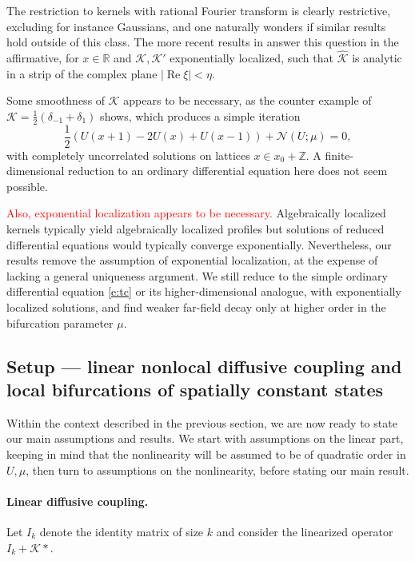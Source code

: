 \documentclass[10pt]{article}
\newcommand{\R}{\mathbb{R}}
\newcommand{\Z}{\mathbb{Z}}
\def\Re{\mathop{\mathrm{Re}}}
\newcommand{\Nl}{\mathcal{N}}
\newcommand{\K}{\mathcal{K}}
\begin{document}
The restriction to kernels with rational Fourier transform is clearly restrictive, excluding for instance Gaussians, and one naturally wonders if similar results hold outside of this class. The more recent results in \cite{FScmfd} answer this question in the affirmative, for $x\in\R$ and $\K,\K'$ exponentially localized, such that $\hat{\K}$ is analytic in a strip of the complex plane $|\Re\xi|<\eta$. 

Some smoothness of $\K$ appears to be necessary, as the counter example of $\K=\frac{1}{2}(\delta_{-1}+\delta_{1})$ shows, which produces a simple iteration 
\[
\frac{1}{2}\left(U(x+1)-2U(x)+U(x-1)\right)+\Nl(U;\mu)=0,
\]
with completely uncorrelated solutions on lattices $x\in x_0+\Z$. A finite-dimensional reduction to an ordinary differential equation here does not seem possible. 

\textcolor{red}{Also, exponential localization appears to be necessary.} Algebraically localized kernels typically yield algebraically localized profiles but solutions of reduced differential equations would typically converge exponentially. Nevertheless, our results remove the assumption of exponential localization, at the expense of lacking a general uniqueness argument. We still reduce to the simple ordinary differential equation \eqref{e:tc} or its higher-dimensional analogue, with exponentially localized solutions, and find weaker far-field decay only at higher order in the bifurcation parameter $\mu$.

\subsection{Setup --- linear nonlocal diffusive coupling and local bifurcations of spatially constant states}\label{s:set}
Within the context described in the previous section, we are now ready to state our main assumptions and results. We start with assumptions on the linear part, keeping in mind that the nonlinearity will be assumed to be of quadratic order in $U,\mu$, then turn to assumptions on the nonlinearity, before stating our main result. 

\paragraph{Linear diffusive coupling.}

Let $I_k$ denote the identity matrix of size $k$ and consider the linearized operator $I_k + \K*$. 
\end{document}
